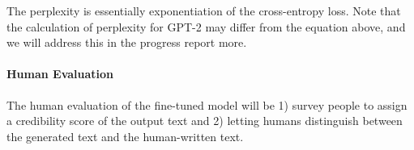 \documentclass[10pt]{article}
\begin{document}
The perplexity is essentially exponentiation of the cross-entropy loss. Note that the calculation of perplexity for GPT-2 may differ from the equation above, and we will address this in the progress report more.

\paragraph{Human Evaluation} The human evaluation of the fine-tuned model will be 1) survey people to assign a credibility score of the output text and 2) letting humans distinguish between the generated text and the human-written text.

\clearpage

\printbibliography 
\end{document}
